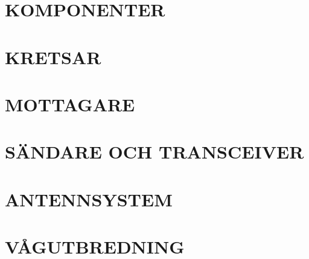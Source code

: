 \documentclass[a4paper,twoside,twocolumn,openright]{book}
\begin{document}
\chapter{KOMPONENTER}

\cleardoublepage

\cleardoublepage

\cleardoublepage

\cleardoublepage

\cleardoublepage

\cleardoublepage

\cleardoublepage

\cleardoublepage


\chapter{KRETSAR}

\cleardoublepage

\cleardoublepage

\cleardoublepage

\cleardoublepage

\cleardoublepage

\cleardoublepage

\cleardoublepage

\cleardoublepage


\chapter{MOTTAGARE}

\cleardoublepage

\cleardoublepage

\cleardoublepage

\cleardoublepage

\cleardoublepage

\cleardoublepage

\cleardoublepage

\cleardoublepage


\chapter{SÄNDARE OCH TRANSCEIVER}

\cleardoublepage

\cleardoublepage


\chapter{ANTENNSYSTEM}

\cleardoublepage

\cleardoublepage

\cleardoublepage

\cleardoublepage

\cleardoublepage


\chapter{VÅGUTBREDNING}

\cleardoublepage

\cleardoublepage

\cleardoublepage

\cleardoublepage

\end{document}
